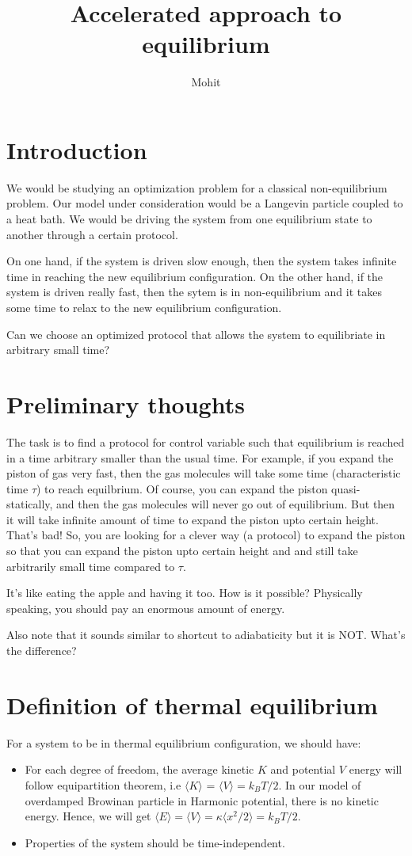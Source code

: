 \documentclass[11pt,a4paper]{article}
\author{Mohit}
\title{Accelerated approach to equilibrium}
\begin{document}
\maketitle

\section{Introduction}
We would be studying an optimization problem for a classical non-equilibrium problem. Our model under consideration would be a Langevin particle coupled to a heat bath. We would be driving the system from one equilibrium state to another through a certain protocol. 

On one hand, if the system is driven slow enough, then the system takes infinite time in reaching the new equilibrium configuration. On the other hand, if the system is driven really fast, then the sytem is in non-equilibrium and it takes some time to relax to the new equilibrium configuration.

Can we choose an optimized protocol that allows the system to equilibriate in arbitrary small time?

\section{Preliminary thoughts}
The task is to find a protocol for control variable such that equilibrium is reached in a time arbitrary smaller than the usual time. For example, if you expand the piston of gas very fast, then the gas molecules will take some time (characteristic time $\tau$) to reach equilbrium. Of course, you can expand the piston quasi-statically, and then the gas molecules will never go out of equilibrium. But then it will take infinite amount of time to expand the piston upto certain height. That's bad! So, you are looking for a clever way (a protocol) to expand the piston so that you can expand the piston upto certain height and and still take arbitrarily small time compared to $\tau$. 

It's like eating the apple and having it too. How is it possible? Physically speaking, you should pay an enormous amount of energy.


Also note that it sounds similar to shortcut to adiabaticity but it is NOT. What's the difference?

\section{Definition of thermal equilibrium}
For a system to be in thermal equilibrium configuration, we should have:
\begin{itemize}
\item For each degree of freedom, the average kinetic $K$ and potential $V$  energy will follow equipartition theorem, i.e  $\langle K \rangle$ = $\langle V \rangle = k_B T/2$. In our model of  overdamped Browinan particle in Harmonic potential, there is no kinetic energy. Hence, we will get   $  \langle E \rangle= \langle V \rangle = \kappa \langle x^2 /2\rangle = k_B T/2$.
\item Properties of the system should be time-independent.
\end{itemize}
\end{document}
